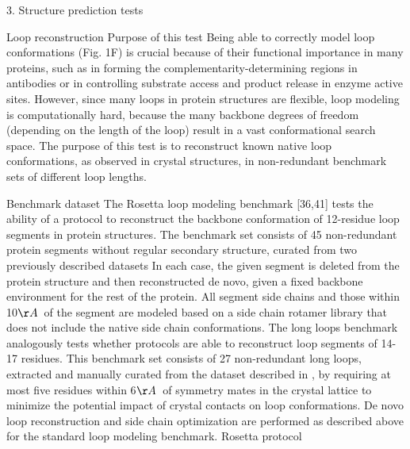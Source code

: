 3. Structure prediction tests

Loop reconstruction
Purpose of this test
Being able to correctly model loop conformations (Fig. 1F) is crucial because of their functional importance in many proteins, such as in forming the complementarity-determining regions in antibodies or in controlling substrate access and product release in enzyme active sites. However, since many loops in protein structures are flexible, loop modeling is computationally hard, because the many backbone degrees of freedom (depending on the length of the loop) result in a vast conformational search space. The purpose of this test is to reconstruct known native loop conformations, as observed in crystal structures, in non-redundant benchmark sets of different loop lengths.

Benchmark dataset
The Rosetta loop modeling benchmark [36,41] tests the ability of a protocol to reconstruct the backbone conformation of 12-residue loop segments in protein structures. The benchmark set consists of 45 non-redundant protein segments without regular secondary structure, curated from two previously described datasets \cite{sellers_toward_2008,wang_proteinprotein_2007,fiser_modeling_2000,rohl_modeling_2004,zhu_long_2006}
In each case, the given segment is deleted from the protein structure and then reconstructed de novo, given a fixed backbone environment for the rest of the protein. All segment side chains and those within 10$\AA$\ of the segment are modeled based on a side chain rotamer library \cite{shapovalov_smoothed_2011} that does not include the native side chain conformations.
The long loops benchmark \cite{stein_improvements_2013} analogously tests whether protocols are able to reconstruct loop segments of 14-17 residues. This benchmark set consists of 27 non-redundant long loops, extracted and manually curated from the dataset described in \cite{zhao_progress_2011}, by requiring at most five residues within 6$\AA$\ of symmetry mates in the crystal lattice to minimize the potential impact of crystal contacts on loop conformations. De novo loop reconstruction and side chain optimization are performed as described above for the standard loop modeling benchmark.
Rosetta protocol
